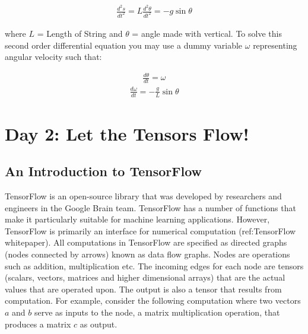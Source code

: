 \documentclass[10pt,letterpaper]{article}
\begin{document}
\begin{eqnarray}\frac{d^2s}{dt^2}=L\frac{d^2\theta}{dt^2}=-g\sin{\theta}\end{eqnarray}

where $L$ = Length of String and $\theta$ = angle made with vertical. To solve this second order differential equation you may use a dummy variable $\omega$ representing angular velocity such that:

\begin{eqnarray}\frac{d\theta}{dt}=\omega \end{eqnarray}
\begin{eqnarray}\frac{d\omega}{dt}=-\frac{g}{L}\sin{\theta} \end{eqnarray}

\section*{Day 2: Let the Tensors Flow!}

\subsection*{An Introduction to TensorFlow}

TensorFlow is an open-source library that was developed by researchers and engineers in the Google Brain team. TensorFlow has a number of functions that make it particularly suitable for machine learning applications. However, TensorFlow is primarily an interface for numerical computation (ref:TensorFlow whitepaper). All computations in TensorFlow are specified as directed graphs (nodes connected by arrows) known as data flow graphs. Nodes are operations such as addition, multiplication etc. The incoming edges for each node are tensors (scalars, vectors, matrices and higher dimensional arrays) that are the actual values that are operated upon. The output is also a tensor that results from computation. For example, consider the following computation where two vectors $a$ and $b$ serve as inputs to the node, a matrix multiplication operation, that produces a matrix $c$ as output.
\end{document}
